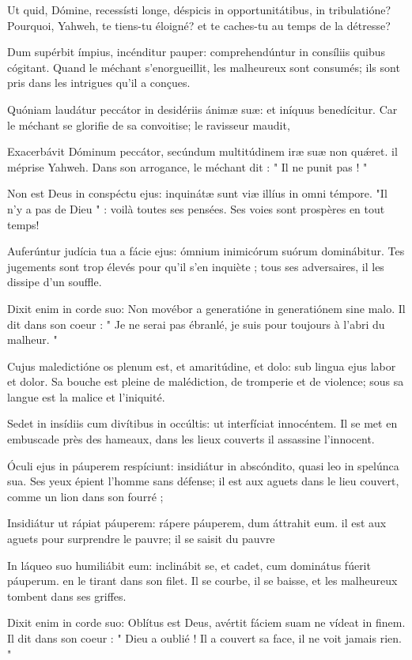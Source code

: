 \begin{paracol}{2}

\LigneParacol{0cm}
{Ut quid, Dómine, recessísti longe, \GreStar{} déspicis in opportunitátibus, in tribulatióne?}
{Pourquoi, Yahweh, te tiens-tu éloigné? et te caches-tu au temps de la détresse? }

\LigneParacol{0.2cm}
{Dum supérbit ímpius, incénditur pauper: \GreStar{} comprehendúntur in consíliis quibus cógitant.}
{Quand le méchant s'enorgueillit, les malheureux sont consumés; ils sont pris dans les intrigues qu'il a conçues. }

\LigneParacol{0.2cm}
{Quóniam laudátur peccátor in desidériis ánimæ suæ: \GreStar{} et iníquus benedícitur.}
{Car le méchant se glorifie de sa convoitise; le ravisseur maudit,}

\LigneParacol{0.2cm}
{Exacerbávit Dóminum peccátor, \GreStar{} secúndum multitúdinem iræ suæ non quǽret.}
{il méprise Yahweh. Dans son arrogance, le méchant dit : " Il ne punit pas ! "}

\LigneParacol{0.2cm}
{Non est Deus in conspéctu ejus: \GreStar{} inquinátæ sunt viæ illíus in omni témpore.}
{"Il n'y a pas de Dieu " : voilà toutes ses pensées. Ses voies sont prospères en tout temps!}

\LigneParacol{0.2cm}
{Auferúntur judícia tua a fácie ejus: \GreStar{} ómnium inimicórum suórum dominábitur.}
{Tes jugements sont trop élevés pour qu'il s'en inquiète ; tous ses adversaires, il les dissipe d'un souffle. }

\LigneParacol{0.2cm}
{Dixit enim in corde suo: \GreStar{} Non movébor a generatióne in generatiónem sine malo.}
{Il dit dans son coeur : " Je ne serai pas ébranlé, je suis pour toujours à l'abri du malheur. " }

\LigneParacol{0.2cm}
{Cujus maledictióne os plenum est, et amaritúdine, et dolo: \GreStar{} sub lingua ejus labor et dolor.}
{Sa bouche est pleine de malédiction, de tromperie et de violence; sous sa langue est la malice et l'iniquité. }

\LigneParacol{0.2cm}
{Sedet in insídiis cum divítibus in occúltis: \GreStar{} ut interfíciat innocéntem.}
{Il se met en embuscade près des hameaux, dans les lieux couverts il assassine l'innocent.}

\LigneParacol{0.2cm}
{Óculi ejus in páuperem respíciunt: \GreStar{} insidiátur in abscóndito, quasi leo in spelúnca sua.}
{Ses yeux épient l'homme sans défense; il est aux aguets dans le lieu couvert, comme un lion dans son fourré ;}

\LigneParacol{0.2cm}
{Insidiátur ut rápiat páuperem: \GreStar{} rápere páuperem, dum áttrahit eum.}
{il est aux aguets pour surprendre le pauvre; il se saisit du pauvre}

\LigneParacol{0.2cm}
{In láqueo suo humiliábit eum: \GreStar{} inclinábit se, et cadet, cum dominátus fúerit páuperum.}
{en le tirant dans son filet. Il se courbe, il se baisse, et les malheureux tombent dans ses griffes. }

\LigneParacol{0.2cm}
{Dixit enim in corde suo: Oblítus est Deus, \GreStar{} avértit fáciem suam ne vídeat in finem.}
{Il dit dans son coeur : " Dieu a oublié ! Il a couvert sa face, il ne voit jamais rien. " }

\end{paracol}
